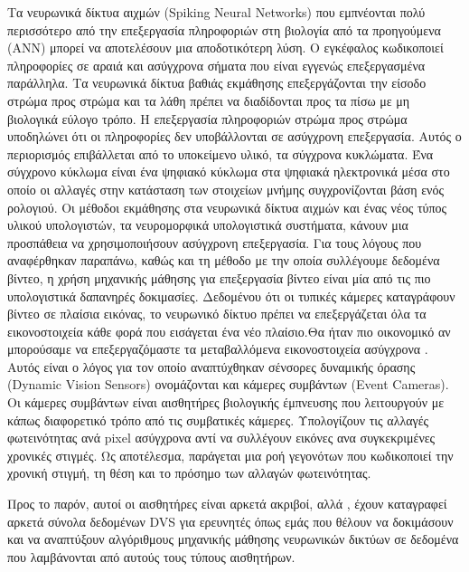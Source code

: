 \documentclass[12pt]{report}
\begin{document}
Τα νευρωνικά δίκτυα αιχμών \textlatin{(Spiking Neural Networks)} που εμπνέονται πολύ περισσότερο από την επεξεργασία πληροφοριών στη βιολογία από τα προηγούμενα (ANN) μπορεί να αποτελέσουν μια αποδοτικότερη λύση. Ο εγκέφαλος κωδικοποιεί πληροφορίες σε αραιά και ασύγχρονα σήματα που είναι εγγενώς επεξεργασμένα παράλληλα. Τα νευρωνικά δίκτυα βαθιάς εκμάθησης επεξεργάζονται την είσοδο στρώμα προς στρώμα και τα λάθη πρέπει να διαδίδονται προς τα πίσω με μη βιολογικά εύλογο τρόπο. Η επεξεργασία πληροφοριών στρώμα προς στρώμα υποδηλώνει ότι οι πληροφορίες δεν υποβάλλονται σε ασύγχρονη επεξεργασία. Αυτός ο περιορισμός επιβάλλεται από το υποκείμενο υλικό, τα σύγχρονα κυκλώματα. Ένα σύγχρονο κύκλωμα είναι ένα ψηφιακό κύκλωμα στα ψηφιακά ηλεκτρονικά μέσα στο οποίο οι αλλαγές στην κατάσταση των στοιχείων μνήμης συγχρονίζονται βάση ενός ρολογιού. Οι μέθοδοι εκμάθησης στα  νευρωνικά δίκτυα αιχμών και ένας νέος τύπος υλικού υπολογιστών, τα νευρομορφικά υπολογιστικά συστήματα, κάνουν μια προσπάθεια να χρησιμοποιήσουν ασύγχρονη επεξεργασία.
Για τους λόγους που αναφέρθηκαν παραπάνω, καθώς και τη μέθοδο με την οποία συλλέγουμε δεδομένα βίντεο, η χρήση μηχανικής μάθησης για επεξεργασία βίντεο είναι μία από τις πιο υπολογιστικά δαπανηρές δοκιμασίες. Δεδομένου ότι οι τυπικές κάμερες καταγράφουν βίντεο σε πλαίσια εικόνας, το νευρωνικό δίκτυο πρέπει να επεξεργάζεται όλα τα εικονοστοιχεία κάθε φορά που εισάγεται ένα νέο πλαίσιο.Θα ήταν πιο οικονομικό αν μπορούσαμε να επεξεργαζόμαστε τα μεταβαλλόμενα εικονοστοιχεία ασύγχρονα . Αυτός είναι ο λόγος για τον οποίο αναπτύχθηκαν σένσορες δυναμικής όρασης \textlatin{(Dynamic Vision Sensors)} ονομάζονται και κάμερες συμβάντων \textlatin{(Event Cameras)}. Οι κάμερες συμβάντων είναι αισθητήρες βιολογικής έμπνευσης που λειτουργούν με κάπως διαφορετικό τρόπο από τις συμβατικές κάμερες. Υπολογίζουν τις αλλαγές φωτεινότητας ανά pixel ασύγχρονα αντί να συλλέγουν εικόνες ανα συγκεκριμένες χρονικές στιγμές. Ως αποτέλεσμα, παράγεται μια ροή γεγονότων που κωδικοποιεί την χρονική στιγμή, τη θέση και το πρόσημο των αλλαγών φωτεινότητας.

Προς το παρόν, αυτοί οι αισθητήρες είναι αρκετά ακριβοί, αλλά , έχουν καταγραφεί αρκετά σύνολα δεδομένων \textlatin{DVS} για ερευνητές όπως εμάς που θέλουν να δοκιμάσουν και να αναπτύξουν αλγόριθμους μηχανικής μάθησης νευρωνικών δικτύων σε δεδομένα που λαμβάνονται από αυτούς τους τύπους αισθητήρων.
\end{document}
